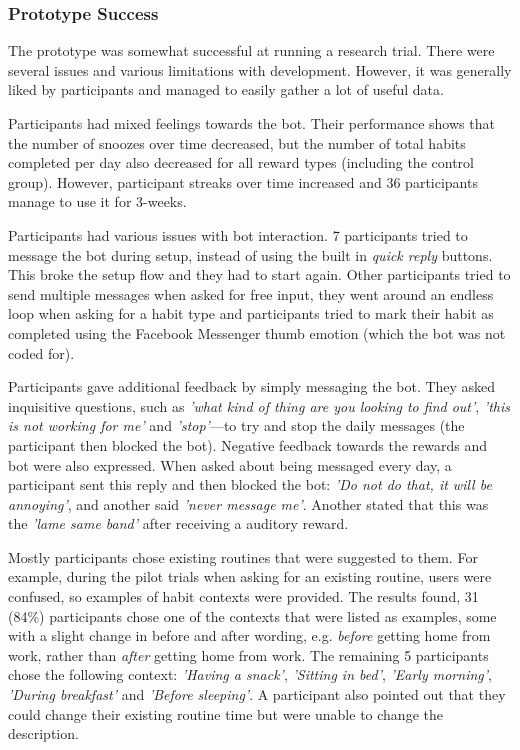 
\subsubsection{Prototype Success}
The prototype was somewhat successful at running a research trial. There were several issues and various limitations with development. However, it was generally liked by participants and managed to easily gather a lot of useful data.

Participants had mixed feelings towards the bot. Their performance shows that the number of snoozes over time decreased, but the number of total habits completed per day also decreased for all reward types (including the control group). However, participant streaks over time increased and 36 participants manage to use it for 3-weeks.

Participants had various issues with bot interaction. 7 participants tried to message the bot during setup, instead of using the built in \textit{quick reply} buttons. This broke the setup flow and they had to start again. Other participants tried to send multiple messages when asked for free input, they went around an endless loop when asking for a habit type and participants tried to mark their habit as completed using the Facebook Messenger thumb emotion (which the bot was not coded for).

Participants gave additional feedback by simply messaging the bot. They asked inquisitive questions, such as \textit{'what kind of thing are you looking to find out'}, \textit{'this is not working for me'} and \textit{'stop'}---to try and stop the daily messages (the participant then blocked the bot). Negative feedback towards the rewards and bot were also expressed. When asked about being messaged every day, a participant sent this reply and then blocked the bot: \textit{'Do not do that, it will be annoying'}, and another said \textit{'never message me'}. Another stated that this was the \textit{'lame same band'} after receiving a auditory reward.

Mostly participants chose existing routines that were suggested to them. For example, during the pilot trials when asking for an existing routine, users were confused, so examples of habit contexts were provided. The results found, 31 (84\%) participants chose one of the contexts that were listed as examples, some with a slight change in before and after wording, e.g. \textit{before} getting home from work, rather than \textit{after} getting home from work. The remaining 5 participants chose the following context: \textit{'Having a snack'}, \textit{'Sitting in bed'}, \textit{'Early morning'}, \textit{'During breakfast'} and \textit{'Before sleeping'}. A participant also pointed out that they could change their existing routine time but were unable to change the description.

